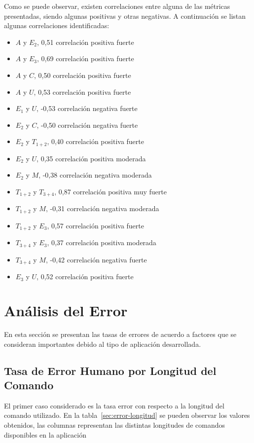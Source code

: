 Como se puede observar, existen correlaciones entre alguna de las m\'etricas presentadas, 
siendo algunas positivas y otras negativas. A continuaci\'on se listan algunas correlaciones identificadas:

\begin{itemize}
    \item $A$ y $E_2$, 0,51 correlaci\'on positiva fuerte
    \item $A$ y $E_3$, 0,69 correlaci\'on positiva fuerte
    \item $A$ y $C$, 0,50 correlaci\'on positiva fuerte
    \item $A$ y $U$, 0,53 correlaci\'on positiva fuerte
    \item $E_1$ y $U$, -0,53 correlaci\'on negativa fuerte
    \item $E_2$ y $C$, -0,50 correlaci\'on negativa fuerte
    \item $E_2$ y $T_{1+2}$, 0,40 correlaci\'on positiva fuerte
    \item $E_2$ y $U$, 0,35 correlaci\'on positiva moderada
    \item $E_2$ y $M$, -0,38 correlaci\'on negativa moderada
    \item $T_{1+2}$ y $T_{3+4}$, 0,87 correlaci\'on positiva muy fuerte
    \item $T_{1+2}$ y $M$, -0,31 correlaci\'on negativa moderada
    \item $T_{1+2}$ y $E_3$, 0,57 correlaci\'on positiva fuerte
    \item $T_{3+4}$ y $E_3$, 0,37 correlaci\'on positiva moderada
    \item $T_{3+4}$ y $M$, -0,42 correlaci\'on negativa fuerte
    \item $E_3$ y $U$, 0,52 correlaci\'on positiva fuerte
\end{itemize}


\section{An\'alisis del Error}

En esta secci\'on se presentan las tasas de errores de acuerdo a factores que se consideran importantes debido
al tipo de aplicaci\'on desarrollada. 

\subsection{Tasa de Error Humano por Longitud del Comando}
El primer caso considerado es la tasa error con respecto a la longitud del comando
utilizado. En la tabla~\ref{sec:error-longitud} se pueden observar los valores obtenidos, las columnas
representan las distintas longitudes de comandos disponibles en la aplicaci\'on

